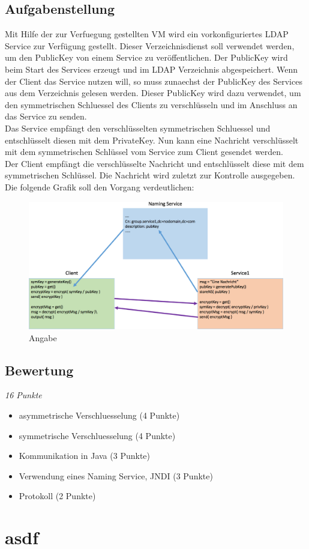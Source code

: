 \documentclass[letterpaper, 12pt]{article}
\let\tempsection\section
\renewcommand\section[1]{\vspace{-0.3cm}\tempsection{#1}\vspace{-0.3cm}}
\let\tempsubsection\subsection
\renewcommand\subsection[1]{\vspace{0cm}\tempsubsection{#1}\vspace{0cm}}
\begin{document}
\subsection{Aufgabenstellung}
Mit Hilfe der zur Verfuegung gestellten VM wird ein vorkonfiguriertes LDAP Service zur Verfügung gestellt. Dieser Verzeichnisdienst soll verwendet werden, um den PublicKey von einem Service zu veröffentlichen. Der PublicKey wird beim Start des Services erzeugt und im LDAP Verzeichnis abgespeichert. Wenn der Client das Service nutzen will, so muss zunaechst der PublicKey des Services aus dem Verzeichnis gelesen werden. Dieser PublicKey wird dazu verwendet, um den symmetrischen Schluessel des Clients zu verschlüsseln und im Anschluss an das Service zu senden. \\
Das Service empfängt den verschlüsselten symmetrischen Schluessel und entschlüsselt diesen mit dem PrivateKey. Nun kann eine Nachricht verschlüsselt mit dem symmetrischen Schlüssel vom Service zum Client gesendet werden. \\
Der Client empfängt die verschlüsselte Nachricht und entschlüsselt diese mit dem symmetrischen Schlüssel. Die Nachricht wird zuletzt zur Kontrolle ausgegeben. \newpage
Die folgende Grafik soll den Vorgang verdeutlichen: 
\begin{figure}[!h]
	\begin{center}
		\includegraphics[width=1\linewidth]{images/dezsys05_java_security_demo1}
		\caption{Angabe}
		\label{Angabe}
	\end{center}
\end{figure}

\subsection{Bewertung}
\textit{16 Punkte}
\begin{itemize}
	\item asymmetrische Verschluesselung (4 Punkte)
	\item symmetrische Verschluesselung (4 Punkte)
	\item Kommunikation in Java (3 Punkte)
	\item Verwendung eines Naming Service, JNDI (3 Punkte)
	\item Protokoll (2 Punkte)
\end{itemize}

\newpage

\section{asdf}

\newpage



\lstlistoflistings
\listoffigures
\end{document}
